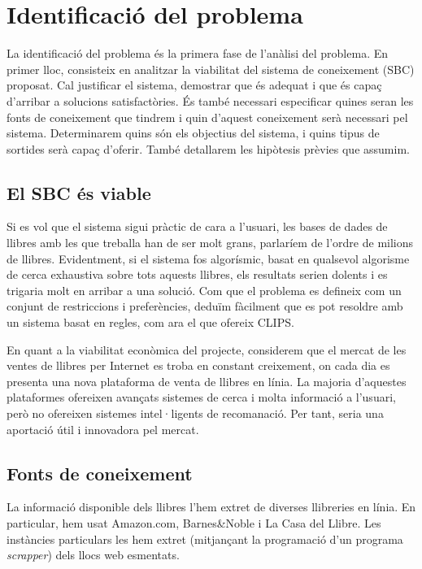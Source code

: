 
\section{Identificació del problema}

La identificació del problema és la primera fase de l'anàlisi del problema. En primer lloc, consisteix en analitzar la viabilitat del sistema de coneixement (SBC) proposat. Cal justificar el sistema, demostrar que és adequat i que és capaç d'arribar a solucions satisfactòries. És també necessari especificar quines seran les fonts de coneixement que tindrem i quin d'aquest coneixement serà necessari pel sistema. Determinarem quins són els objectius del sistema, i quins tipus de sortides serà capaç d'oferir. També detallarem les hipòtesis prèvies que assumim.

\subsection{El SBC és viable}

Si es vol que el sistema sigui pràctic de cara a l'usuari, les bases de dades de llibres amb les que treballa han de ser molt grans, parlaríem de l'ordre de milions de llibres. Evidentment, si el sistema fos algorísmic, basat en qualsevol algorisme de cerca exhaustiva sobre tots aquests llibres, els resultats serien dolents i es trigaria molt en arribar a una solució. Com que el problema es defineix com un conjunt de restriccions i preferències, deduïm fàcilment que es pot resoldre amb un sistema basat en regles, com ara el que ofereix CLIPS.

En quant a la viabilitat econòmica del projecte, considerem que el mercat de les ventes de llibres per Internet es troba en constant creixement, on cada dia es presenta una nova plataforma de venta de llibres en línia. La majoria d'aquestes plataformes ofereixen avançats sistemes de cerca i molta informació a l'usuari, però no ofereixen sistemes intel·ligents de recomanació. Per tant, seria una aportació útil i innovadora pel mercat.

\subsection{Fonts de coneixement}

La informació disponible dels llibres l'hem extret de diverses llibreries en línia. En particular, hem usat Amazon.com, Barnes&Noble i La Casa del Llibre. Les instàncies particulars les hem extret (mitjançant la programació d'un programa \emph{scrapper}) dels llocs web esmentats.

